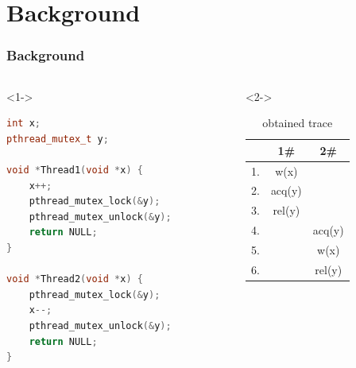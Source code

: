 \documentclass[xcolor=dvipsnames]{beamer}
\begin{document}
	\section{Background}
		\begin{frame}[fragile]
			\frametitle{Background}
			\begin{columns}
				\begin{column}{0.55\textwidth}<1->
				\begin{lstlisting}[caption={program exhibiting a data race},language=C++]
int x;
pthread_mutex_t y;

void *Thread1(void *x) {
	x++;
	pthread_mutex_lock(&y);
	pthread_mutex_unlock(&y);
	return NULL;
}

void *Thread2(void *x) {
	pthread_mutex_lock(&y);
	x--;
	pthread_mutex_unlock(&y);
	return NULL;
}
				\end{lstlisting}
				\end{column}
				\begin{column}{0.5\textwidth}<2->
					\begin{table}
						\begin{center}
							\begin{tabular}{ c c c}
								& 1\# & 2\# \\
								\hline
								1. & w(x) & \\
								2. & acq(y) & \\
								3. & rel(y) & \\
								4. & & acq(y) \\
								5. & & w(x) \\
								6. & & rel(y) \\
							\end{tabular}
						\caption{obtained trace}
						\label{trace1}
						\end{center}
					\end{table}
				\end{column}
			\end{columns}
			
		\end{frame}
	
\end{document}
